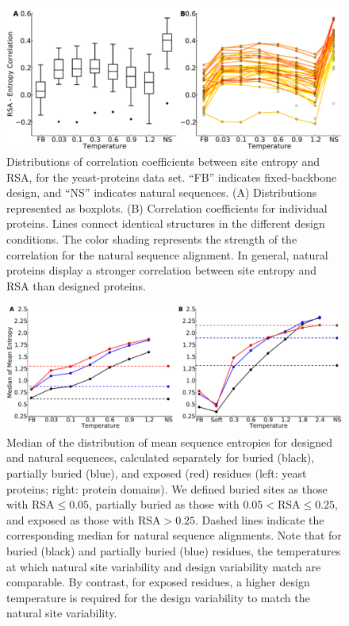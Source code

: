 \documentclass[12pt]{article}
\begin{document}
\begin{figure}[H]
\centerline{\includegraphics[width = 6in]{figures/Cor_Mean_Entropy_RSA_Combination_Plot.pdf}}
\caption{Distributions of correlation coefficients between site entropy and RSA, for the yeast-proteins data set. ``FB'' indicates fixed-backbone design, and ``NS'' indicates natural sequences. (A) Distributions represented as boxplots. (B) Correlation coefficients for individual proteins. Lines connect identical structures in the different design conditions. The color shading represents the strength of the correlation for the natural sequence alignment. In general, natural proteins display a stronger correlation between site entropy and RSA than designed proteins.}
\label{Correlation_figure}
\end{figure}


\begin{figure}[H]
\centerline{\includegraphics[width = 6in]{figures/Mean_Entropy_Position_Lineplot_Combo.pdf}}
\caption{Median of the distribution of mean sequence entropies for designed and natural sequences, calculated separately for buried (black), partially buried (blue), and exposed (red) residues (left: yeast proteins; right: protein domains). We defined buried sites as those with $\text{RSA}\leq 0.05$, partially buried as those with $0.05<\text{RSA}\leq0.25$, and exposed as those with $\text{RSA}>0.25$. Dashed lines indicate the corresponding median for natural sequence alignments. Note that for buried (black) and partially buried (blue) residues, the temperatures at which natural site variability and design variability match are comparable. By contrast, for exposed residues, a higher design temperature is required for the design variability to match the natural site variability.}
\label{Mean_Entropy_Surface_Core}
\end{figure}
\end{document}
